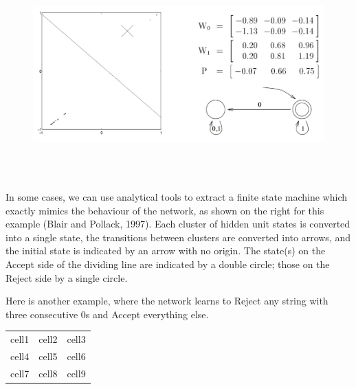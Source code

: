 \documentclass[11pt]{article}
\begin{document}
\begin{figure}[h]
    \centering
    \includegraphics[width=12cm, height=8cm]{../out/images/dynamic-recognisers}
    \caption{}
    \label{fig: dynamic recognisers}
\end{figure}

In some cases, we can use analytical tools to extract a finite state machine
which exactly mimics the behaviour of the network, as shown on the right for
this example (Blair and Pollack, 1997).
Each cluster of hidden unit states is converted into a single state, the
transitions between clusters are converted into arrows, and the initial state
is indicated by an arrow with no origin.
The state(s) on the Accept side of the dividing line are indicated by a double
circle;
those on the Reject side by a single circle.

Here is another example, where the network learns to Reject any string with
three consecutive $0$s and Accept everything else.

\begin{center}
\begin{tabular}{ |c|c|c| }
 \hline
 cell1 & cell2 & cell3 \\
 cell4 & cell5 & cell6 \\
 cell7 & cell8 & cell9 \\
 \hline
\end{tabular}
\end{center}
\end{document}
